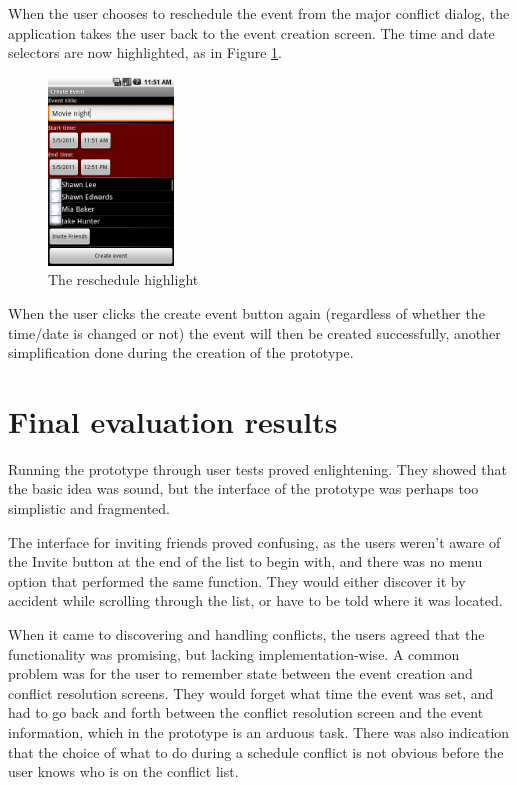 \documentclass[]{report}
\begin{document}
When the user chooses to reschedule the event from the major conflict dialog,
the application takes the user back to the event creation screen. The time and
date selectors are now highlighted, as in Figure \ref{fig:reschedule}.

\begin{figure}[htb]
  \centering
  \includegraphics[height=50mm]{reschedule}
  \caption{The reschedule highlight}
  \label{fig:reschedule}
\end{figure}

When the user clicks the create event button again (regardless of whether the
time/date is changed or not) the event will then be created successfully,
another simplification done during the creation of the prototype.

\section{Final evaluation results}

Running the prototype through user tests proved enlightening. They showed that the
basic idea was sound, but the interface of the prototype was perhaps too
simplistic and fragmented.

The interface for inviting friends proved confusing, as the users weren't aware
of the Invite button at the end of the list to begin with, and there was no menu
option that performed the same function. They would either discover it by
accident while scrolling through the list, or have to be told where it was
located.

When it came to discovering and handling conflicts, the users agreed that the
functionality was promising, but lacking implementation-wise. A common problem
was for the user to remember state between the event creation and conflict
resolution screens. They would forget what time the event was set, and had to go
back and forth between the conflict resolution screen and the event information,
which in the prototype is an arduous task. There was also indication that the
choice of what to do during a schedule conflict is not obvious before the user
knows who is on the conflict list.
\end{document}
